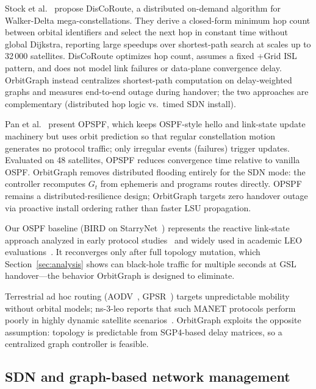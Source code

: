Stock et al.~\cite{gregory:satellite-routing:2022} propose DisCoRoute, a
distributed on-demand algorithm for Walker-Delta mega-constellations.
They derive a closed-form minimum hop count between orbital identifiers and
select the next hop in constant time without global Dijkstra, reporting large
speedups over shortest-path search at scales up to 32\,000 satellites.
DisCoRoute optimizes hop count, assumes a fixed +Grid ISL pattern, and does
not model link failures or data-plane convergence delay.
OrbitGraph instead centralizes shortest-path computation on delay-weighted
graphs and measures end-to-end outage during handover; the two approaches are
complementary (distributed hop logic vs.\ timed SDN install).

Pan et al.~\cite{pam:opspf:2019} present OPSPF, which keeps OSPF-style hello
and link-state update machinery but uses orbit prediction so that regular
constellation motion generates no protocol traffic; only irregular events
(failures) trigger updates.
Evaluated on 48 satellites, OPSPF reduces convergence time relative to vanilla
OSPF.
OrbitGraph removes distributed flooding entirely for the SDN mode: the
controller recomputes $G_t$ from ephemeris and programs routes directly.
OPSPF remains a distributed-resilience design; OrbitGraph targets zero handover
outage via proactive install ordering rather than faster LSU propagation.

Our OSPF baseline (BIRD on StarryNet~\cite{lai2023starrynet}) represents the
reactive link-state approach analyzed in early protocol
studies~\cite{sidhu:ospf:1993} and widely used in academic LEO
evaluations~\cite{manzanareslopez2025comprehensive}.
It reconverges only after full topology mutation, which Section~\ref{sec:analysis}
shows can black-hole traffic for multiple seconds at GSL handover---the behavior
OrbitGraph is designed to eliminate.

Terrestrial ad hoc routing (AODV~\cite{perkins:aodv:1999},
GPSR~\cite{karp:gpsr:2000}) targets unpredictable mobility without orbital
models; ns-3-leo reports that such MANET protocols perform poorly in highly
dynamic satellite scenarios~\cite{ns3leo2022}.
OrbitGraph exploits the opposite assumption: topology is predictable from
SGP4-based delay matrices, so a centralized graph controller is feasible.

\subsection{SDN and graph-based network management}

